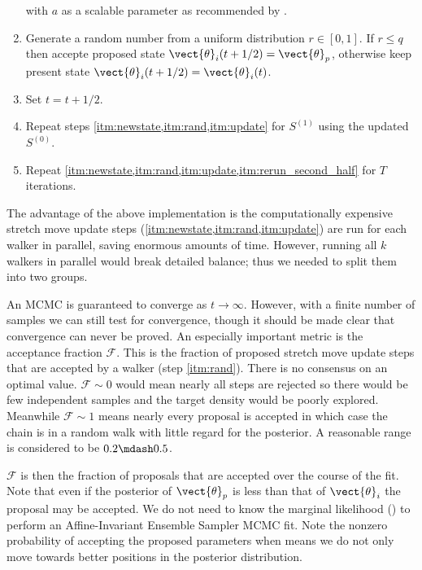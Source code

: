 \begin{enumerate}
\noindent with $a$ as a scalable parameter as recommended by .

\item \label{itm:rand} Generate a random number from a uniform distribution $r \in [0, 1]$.  If $r \leq q$ then accepte proposed state
$\vect{\theta}_i(t + 1/2) = \vect{\theta}_p$, otherwise keep present state $\vect{\theta}_i(t + 1/2) = \vect{\theta}_i(t)$.

\item \label{itm:update}  Set $t = t + 1/2$.

\item \label{itm:rerun_second_half} Repeat steps \cref{itm:newstate,itm:rand,itm:update} for $S^{(1)}$ using the updated $S^{(0)}$.

\item Repeat \cref{itm:newstate,itm:rand,itm:update,itm:rerun_second_half} for $T$ iterations.
\end{enumerate}

The advantage of the above implementation is the computationally expensive stretch move update steps
(\cref{itm:newstate,itm:rand,itm:update}) are run
for each walker in parallel, saving enormous amounts of time.  However, running all $k$ walkers in parallel would break detailed balance;
thus we needed to split them into two groups.

An MCMC is guaranteed to converge as $t \rightarrow \infty$.  However, with a finite number of samples we can still test for convergence,
though it should be made clear that convergence can never be proved.  An especially important metric is the acceptance fraction
$\mathcal{F}$.  This is the fraction of proposed stretch move update steps that are accepted by a walker (step \cref{itm:rand}).  There is
no consensus on an optimal value.  $\mathcal{F} \sim 0$ would mean nearly all steps are rejected so there would be few independent samples
and the target density would be poorly explored.  Meanwhile $\mathcal{F} \sim 1$ means nearly every proposal is accepted in which case
the chain is in a random walk with little regard for the posterior.  A reasonable range is considered to be $0.2 \mdash 0.5$.

$\mathcal{F}$ is then
the fraction of proposals that are accepted over the course of the fit.  Note that even if the posterior of $\vect{\theta}_p$ is less than
that of $\vect{\theta}_i$ the proposal may be accepted.  We do not need to know the marginal
likelihood () to perform an Affine-Invariant Ensemble Sampler MCMC
fit.  Note the nonzero probability of accepting the
proposed parameters when  means we do not only move towards better positions in the posterior distribution.

